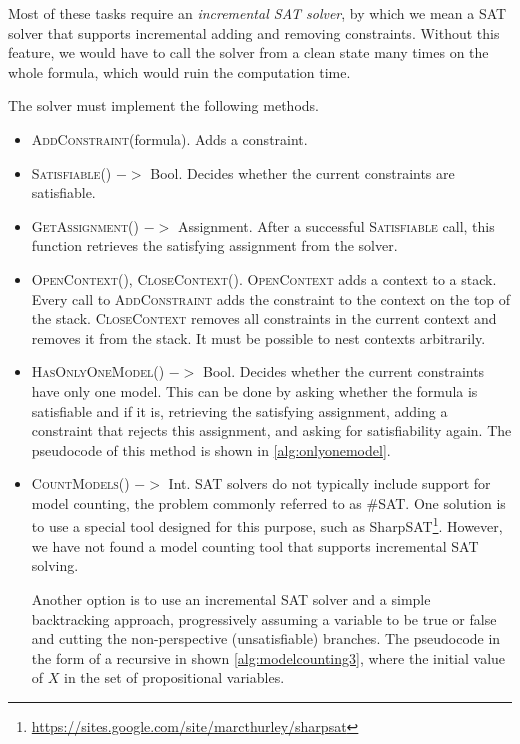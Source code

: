 Most of these tasks require an \emph{incremental SAT solver}, by which we mean a
  SAT solver that supports incremental adding and removing constraints.
Without this feature, we would have to call the solver from a clean state
  many times on the whole formula, which would ruin the computation time.

The solver must implement the following methods.
\begin{itemize}
\item \textsc{AddConstraint}(formula). Adds a constraint.
\item \textsc{Satisfiable()} $->$ Bool. Decides whether the current constraints are satisfiable.
\item \textsc{GetAssignment()} $->$ Assignment.
  After a successful \textsc{Satisfiable} call, this function retrieves
  the satisfying assignment from the solver.
\item \textsc{OpenContext(), CloseContext()}.
  \textsc{OpenContext} adds a context to a stack.
  Every call to \textsc{AddConstraint} adds the constraint to the context on the top of the stack.
  \textsc{CloseContext} removes all constraints in the current context and removes it
  from the stack. It must be possible to nest contexts arbitrarily.
\item \textsc{HasOnlyOneModel()} $->$ Bool. Decides whether the current constraints have only one model.
  This can be done by asking whether the formula is satisfiable and if it is,
  retrieving the satisfying assignment, adding
  a constraint that rejects this assignment, and asking for satisfiability again.
  The pseudocode of this method is shown in \autoref{alg:onlyonemodel}.

\item \textsc{CountModels()} $->$ Int.
SAT solvers do not typically include support for model counting, the problem
  commonly referred to as \#SAT.
One solution is to use
  a special tool designed for this purpose,
  such as SharpSAT\footnote{\url{https://sites.google.com/site/marcthurley/sharpsat}}\cite{sharpsat}.
However, we have not found a model counting tool that supports incremental SAT solving.


Another option is to use an incremental SAT solver and a simple backtracking approach,
  progressively assuming a variable to be true or false and cutting the non-perspective
  (unsatisfiable) branches.
The pseudocode in the form of a recursive in shown \autoref{alg:modelcounting3},
  where the initial value of $X$ in the set of propositional variables.
\end{itemize}

